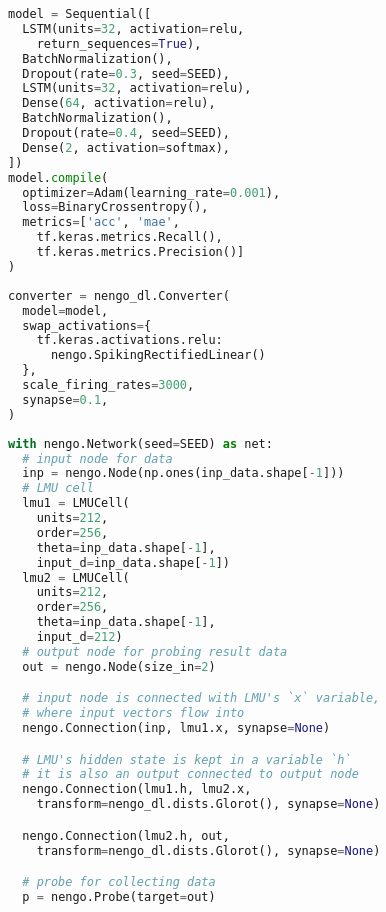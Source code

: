\begin{lstlisting}[language=Python,label=list:code_ann2,caption=Implementation of Long Short-Term Memory ANN.,captionpos=b,frame=single,float]
model = Sequential([
  LSTM(units=32, activation=relu,
    return_sequences=True),
  BatchNormalization(),
  Dropout(rate=0.3, seed=SEED),
  LSTM(units=32, activation=relu),
  Dense(64, activation=relu),
  BatchNormalization(),
  Dropout(rate=0.4, seed=SEED),
  Dense(2, activation=softmax),
])
model.compile(
  optimizer=Adam(learning_rate=0.001),
  loss=BinaryCrossentropy(),
  metrics=['acc', 'mae',
    tf.keras.metrics.Recall(),
    tf.keras.metrics.Precision()]
)
\end{lstlisting}

\begin{lstlisting}[language=Python,label=list:code_snn1,caption=Conversion of ANN model 1 to SNN model 3.,captionpos=b,frame=single,float]
converter = nengo_dl.Converter(
  model=model,
  swap_activations={
    tf.keras.activations.relu:
      nengo.SpikingRectifiedLinear()
  },
  scale_firing_rates=3000,
  synapse=0.1,
)
\end{lstlisting}

\begin{lstlisting}[language=Python,label=list:code_snn2,caption=SNN model with Legendre Memory Units.,captionpos=b,frame=single,float]
with nengo.Network(seed=SEED) as net:
  # input node for data
  inp = nengo.Node(np.ones(inp_data.shape[-1]))
  # LMU cell
  lmu1 = LMUCell(
    units=212,
    order=256,
    theta=inp_data.shape[-1],
    input_d=inp_data.shape[-1])
  lmu2 = LMUCell(
    units=212,
    order=256,
    theta=inp_data.shape[-1],
    input_d=212)
  # output node for probing result data
  out = nengo.Node(size_in=2)

  # input node is connected with LMU's `x` variable,
  # where input vectors flow into
  nengo.Connection(inp, lmu1.x, synapse=None)

  # LMU's hidden state is kept in a variable `h`
  # it is also an output connected to output node
  nengo.Connection(lmu1.h, lmu2.x,
    transform=nengo_dl.dists.Glorot(), synapse=None)

  nengo.Connection(lmu2.h, out,
    transform=nengo_dl.dists.Glorot(), synapse=None)

  # probe for collecting data
  p = nengo.Probe(target=out)
\end{lstlisting}

\newpage

%
%

